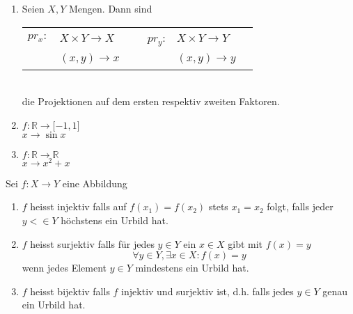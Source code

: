 \begin{enumerate}
\begin{center}
\end{center}


\item Seien $X,Y$ Mengen. Dann sind \\
\begin{tabular}{r  l c r l c }
$pr_x:$ & $X\times Y\rightarrow X $& ~ & $pr_y$: & $X\times Y\rightarrow Y$ \\
~& $(x,y)\rightarrow x$ & ~& ~& $(x,y)\rightarrow y$ \\
\end{tabular}\\
die Projektionen auf dem ersten respektiv zweiten Faktoren. 
\item $f:\mathbb{R}\rightarrow\lbrack -1,1\rbrack$\\ $x\rightarrow \sin x$
\item $f:\mathbb{R}\rightarrow\mathbb{R}$\\
$x\rightarrow x^2+x$
\end{enumerate}
\begin{definition}{1.11}
Sei $f:X\rightarrow Y$ eine Abbildung
\begin{enumerate}
\item $f$ heisst injektiv falls auf $f(x_1)=f(x_2)$ stets $x_1=x_2$ folgt, falls jeder $y<\in Y$ höchstens ein Urbild hat.
\item $f$ heisst surjektiv falls für jedes $y\in Y$ ein $x\in X$ gibt mit $f(x)=y$ \[\forall y\in Y, \exists x\in X:f(x)=y\]wenn jedes Element $y\in Y$ mindestens ein Urbild hat. 
\item $f$ heisst bijektiv falls $f$ injektiv und surjektiv ist, d.h. falls jedes $y\in Y$ genau ein Urbild hat. 
\end{enumerate}
\end{definition}


